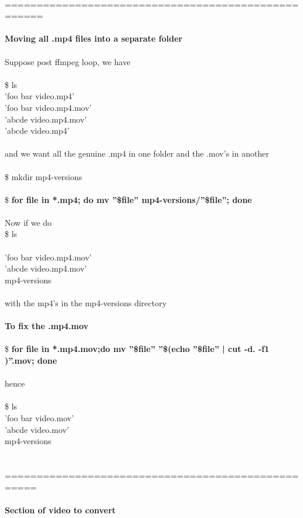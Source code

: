 \documentclass[10pt,a4paper]{article}
\begin{document}
{{{{{{{{{{{{{{\\
====================================================\\
\\
\textbf{Moving all .mp4 files into a separate folder}}{\Large \\
\\
Suppose post ffmpeg loop, we have\\
\\
\$ ls\\
'foo bar video.mp4'\\
'foo bar video.mp4.mov'\\
'abcde video.mp4.mov'\\
'abcde video.mp4'\\
\\
and we want all the genuine .mp4 in one folder and the .mov's in another\\
\\
\$ mkdir mp4-versions\\
\\
\$ \textbf{for file in *.mp4; do mv ''\$file'' mp4-versions/''\$file''; done }}{\Large \\
\\
Now if we do\\
\$ ls\\
\\
'foo bar video.mp4.mov'\\
'abcde video.mp4.mov'\\
mp4-versions\\
\\
with the mp4's in the mp4-versions directory\\
\\
\textbf{To fix the .mp4.mov}}{\Large \\
\\
\$ \textbf{for file in *.mp4.mov;do mv ''\$file'' ''\$(echo ''\$file'' | cut -d. -f1 )''.mov; done}}{\Large \\
\\
hence\\
\\
\$ ls\\
'foo bar video.mov'\\
'abcde video.mov'\\
mp4-versions\\
\\
\\
===================================================\\
\\
\textbf{Section of video to convert}}{\Large \\
}}}}}}}}}}}}}}
\end{document}
